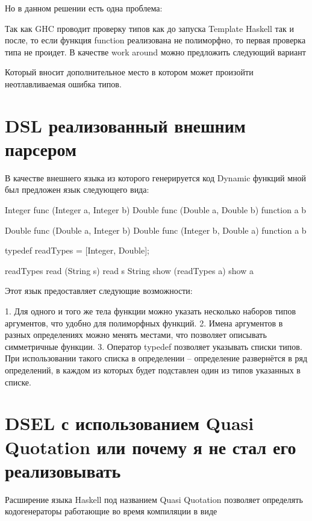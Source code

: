 Но в данном решении есть одна проблема:

Так как GHC проводит проверку типов как до запуска Template Haskell
так и после, то если функция function реализована не полиморфно, то
первая проверка типа не проидет. В качестве work around можно
предложить следующий вариант

\begin{code}
\end{code}

Который вносит дополнительное место в котором может произойти
неотлавливаемая ошибка типов.

\section{DSL реализованный внешним парсером}

В качестве внешнего языка из которого генерируется код Dynamic функций
мной был предложен язык следующего вида:

Integer func (Integer a, Integer b)
Double func (Double a, Double b)
{
  function a b
}

\begin{code}
  Double func (Double a, Integer b)
  Double func (Integer b, Double a)
  {
    function a b
  }

  typedef readTypes = [Integer, Double];

  readTypes read (String s) { read s }
  String show (readTypes a) { show a }
\end{code}

Этот язык предоставляет следующие возможности:

1. Для одного и того же тела функции можно указать несколько наборов
   типов аргументов, что удобно для полиморфных функций.
2. Имена аргументов в разных определениях можно менять местами, что
   позволяет описывать симметричные функции.
3. Оператор typedef позволяет указывать списки типов. При
   использовании такого списка в определении -- определение
   развернётся в ряд определений, в каждом из которых будет подставлен
   один из типов указанных в списке.

\section{DSEL с использованием Quasi Quotation или почему я не стал его
реализовывать}

Расширение языка Haskell под названием Quasi Quotation позволяет
определять кодогенераторы работающие во время компиляции в виде

